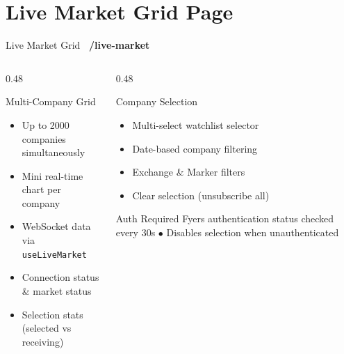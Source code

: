 \documentclass[aspectratio=169, 11pt]{beamer}
\newcommand{\tagbox}[2]{\colorbox{#1}{\scriptsize\color{white}\textbf{~#2~}}}
\begin{document}
\section{Live Market Grid Page}
\begin{frame}{Live Market Grid \hfill \tagbox{accentblue}{/live-market}}
\begin{columns}[T]
\begin{column}{0.48\textwidth}
\begin{block}{Multi-Company Grid}
\begin{itemize}
  \item Up to 2000 companies simultaneously
  \item Mini real-time chart per company
  \item WebSocket data via \texttt{useLiveMarket}
  \item Connection status \& market status
  \item Selection stats (selected vs receiving)
\end{itemize}
\end{block}
\end{column}
\begin{column}{0.48\textwidth}
\begin{block}{Company Selection}
\begin{itemize}
  \item Multi-select watchlist selector
  \item Date-based company filtering
  \item Exchange \& Marker filters
  \item Clear selection (unsubscribe all)
\end{itemize}
\end{block}
\vspace{0.3cm}
\begin{alertblock}{Auth Required}
Fyers authentication status checked every 30s $\bullet$ Disables selection when unauthenticated
\end{alertblock}
\end{column}
\end{columns}
\end{frame}

\end{document}
